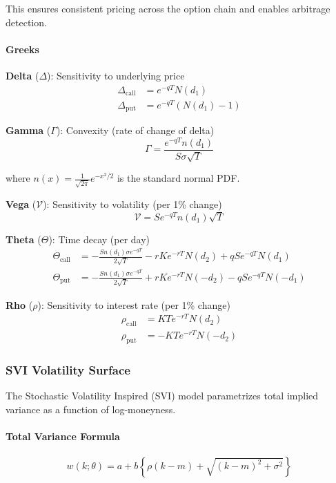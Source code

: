 This ensures consistent pricing across the option chain and enables arbitrage detection.

\paragraph{Greeks}

\textbf{Delta} ($\Delta$): Sensitivity to underlying price
\begin{align*}
\Delta_{\text{call}} &= e^{-qT} N(d_1) \\
\Delta_{\text{put}} &= e^{-qT} (N(d_1) - 1)
\end{align*}

\textbf{Gamma} ($\Gamma$): Convexity (rate of change of delta)
\[
\Gamma = \frac{e^{-qT} n(d_1)}{S \sigma \sqrt{T}}
\]

where $n(x) = \frac{1}{\sqrt{2\pi}} e^{-x^2/2}$ is the standard normal PDF.

\textbf{Vega} ($\mathcal{V}$): Sensitivity to volatility (per 1\% change)
\[
\mathcal{V} = S e^{-qT} n(d_1) \sqrt{T}
\]

\textbf{Theta} ($\Theta$): Time decay (per day)
\begin{align*}
\Theta_{\text{call}} &= -\frac{S n(d_1) \sigma e^{-qT}}{2\sqrt{T}} - rK e^{-rT} N(d_2) + qS e^{-qT} N(d_1) \\
\Theta_{\text{put}} &= -\frac{S n(d_1) \sigma e^{-qT}}{2\sqrt{T}} + rK e^{-rT} N(-d_2) - qS e^{-qT} N(-d_1)
\end{align*}

\textbf{Rho} ($\rho$): Sensitivity to interest rate (per 1\% change)
\begin{align*}
\rho_{\text{call}} &= KT e^{-rT} N(d_2) \\
\rho_{\text{put}} &= -KT e^{-rT} N(-d_2)
\end{align*}

\subsubsection{SVI Volatility Surface}

The Stochastic Volatility Inspired (SVI) model parametrizes total implied variance as a function of log-moneyness.

\paragraph{Total Variance Formula}

\[
w(k; \theta) = a + b \left\{ \rho(k - m) + \sqrt{(k - m)^2 + \sigma^2} \right\}
\]

